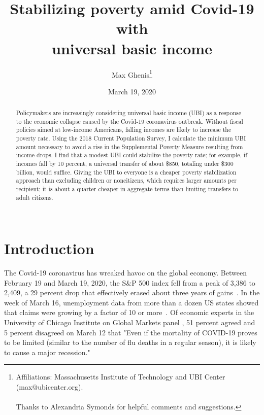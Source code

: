 \documentclass[12pt]{article}
\begin{document}
\begin{titlepage}
\title{Stabilizing poverty amid Covid-19 with
\protect \\universal basic income}
\author{Max Ghenis\thanks{Affiliations: Massachusetts Institute of Technology and UBI Center (max@ubicenter.org).
\protect \\
\protect \\Thanks to Alexandria Symonds for helpful comments and suggestions.
}}

\date{March 19, 2020}
\maketitle
\begin{abstract}
\noindent Policymakers are increasingly considering universal basic income (UBI)
as a response to the economic collapse caused by the
Covid-19 coronavirus outbreak. 
Without fiscal policies aimed at low-income Americans,
falling incomes are likely to increase the poverty rate.
Using the 2018 Current Population Survey,
I calculate the minimum UBI amount necessary to avoid a rise in the
Supplemental Poverty Measure resulting from income drops.
I find that a modest UBI could stabilize the poverty rate;
for example, if incomes fall by 10 percent, 
a universal transfer of about \$850, totaling under \$300 billion,
would suffice.
Giving the UBI to everyone is a cheaper poverty stabilization approach than 
excluding children or noncitizens, which requires larger amounts per recipient;
it is about a quarter cheaper in aggregate terms than
limiting transfers to adult citizens.
\vspace{1in}\\
\vspace{0in}\\

\bigskip
\end{abstract}
\setcounter{page}{0}
\thispagestyle{empty}
\end{titlepage}
\pagebreak \newpage




\doublespacing


\section{Introduction} \label{sec:introduction}

The Covid-19 coronavirus has wreaked havoc on the global economy.
Between February 19 and March 19, 2020,
the S\&P 500 index fell from a peak of 3,386 to 2,409,
a 29 percent drop that effectively erased about three years of 
gains~\cite{sp500}.
In the week of March 16, unemployment data from more than a dozen US states
showed that claims were growing by a factor of 10 or more~\cite{robbins_2020}.
Of economic experts in the University of Chicago Institute on Global Markets
panel \citeyear{igm}, 51 percent agreed and 5 percent disagreed on March 12
that "Even if the mortality of COVID-19 proves to be limited
(similar to the number of flu deaths in a regular season),
it is likely to cause a major recession."
\end{document}
